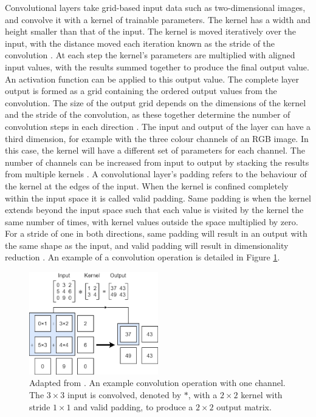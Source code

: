 \documentclass[12pt]{article}
\begin{document}
Convolutional layers take grid-based input data such as two-dimensional images, and convolve it with a kernel of trainable parameters. The kernel has a width and height smaller than that of the input. The kernel is moved iteratively over the input, with the distance moved each iteration known as the stride of the convolution \cite{Aghdam17}. At each step the kernel's parameters are multiplied with aligned input values, with the results summed together to produce the final output value. An activation function can be applied to this output value. The complete layer output is formed as a grid containing the ordered output values from the convolution. The size of the output grid depends on the dimensions of the kernel and the stride of the convolution, as these together determine the number of convolution steps in each direction \cite{Aghdam17}. The input and output of the layer can have a third dimension, for example with the three colour channels of an RGB image. In this case, the kernel will have a different set of parameters for each channel. The number of channels can be increased from input to output by stacking the results from multiple kernels \cite{Aghdam17}. A convolutional layer's padding refers to the behaviour of the kernel at the edges of the input. When the kernel is confined completely within the input space it is called valid padding. Same padding is when the kernel extends beyond the input space such that each value is visited by the kernel the same number of times, with kernel values outside the space multiplied by zero. For a stride of one in both directions, same padding will result in an output with the same shape as the input, and valid padding will result in dimensionality reduction \cite{Goodfellow16, Aghdam17}. An example of a convolution operation is detailed in Figure \ref{convop}.
\begin{figure}[!h]
\centering
\includegraphics[width=0.5\textwidth]{images/convolution.png}
\caption{Adapted from \cite{Goodfellow16}. An example convolution operation with one channel. The $3\times3$ input is convolved, denoted by $\ast$, with a $2\times2$ kernel with stride $1\times1$ and valid padding, to produce a $2\times2$ output matrix.}
\label{convop}
\end{figure}
\end{document}
